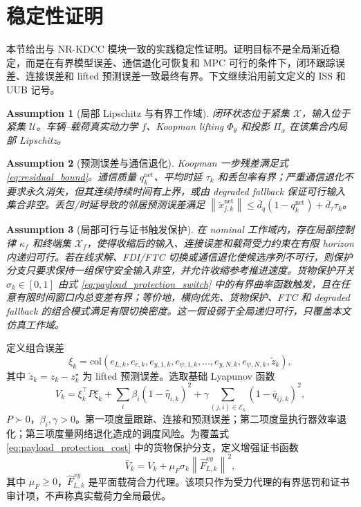 \documentclass[twocolumn,3p,times,procedia]{elsarticle}
\newcommand{\Method}{NR-KDCC}
\newcommand{\norm}[1]{\left\lVert #1 \right\rVert}
\newtheorem{assumption}{Assumption}
\begin{document}
\section{稳定性证明}

本节给出与 \Method{} 模块一致的实践稳定性证明。证明目标不是全局渐近稳定，而是在有界模型误差、通信退化可恢复和 MPC 可行的条件下，闭环跟踪误差、连接误差和 lifted 预测误差一致最终有界。下文继续沿用前文定义的 ISS 和 UUB 记号。

\begin{assumption}[局部 Lipschitz 与有界工作域]
闭环状态位于紧集 $\mathcal X$，输入位于紧集 $\mathcal U$。车辆--载荷真实动力学 $f$、Koopman lifting $\Phi_\theta$ 和投影 $\Pi_x$ 在该集合内局部 Lipschitz。
\end{assumption}

\begin{assumption}[预测误差与通信退化]
Koopman 一步残差满足式 \eqref{eq:residual_bound}。通信质量 $q_k^{\mathrm{net}}$、平均时延 $\tau_k$ 和丢包率有界；严重通信退化不要求永久消失，但其连续持续时间有上界，或由 degraded fallback 保证可行输入集合非空。丢包/时延导致的邻居预测误差满足 $\norm{\tilde x_{j,k}^{\mathrm{net}}}\le \bar d_q(1-q_k^{\mathrm{net}})+\bar d_\tau \tau_k$。
\end{assumption}

\begin{assumption}[局部可行与证书触发保护]
在 nominal 工作域内，存在局部控制律 $\kappa_f$ 和终端集 $\mathcal X_f$，使得收缩后的输入、连接误差和载荷受力约束在有限 horizon 内递归可行。若在线求解、FDI/FTC 切换或通信退化使候选序列不可行，则保护分支只要求保持一组保守安全输入非空，并允许收缩参考推进速度。货物保护开关 $\sigma_k\in[0,1]$ 由式 \eqref{eq:payload_protection_switch} 中的有界曲率函数触发，且在任意有限时间窗口内总变差有界；等价地，横向优先、货物保护、FTC 和 degraded fallback 的组合模式满足有限切换密度。这一假设弱于全局递归可行，只覆盖本文仿真工作域。
\end{assumption}

定义组合误差
\begin{equation}
\xi_k=\mathrm{col}\left(e_{L,k},e_{c,k},e_{y,1,k},e_{\psi,1,k},\ldots,e_{y,N,k},e_{\psi,N,k},\tilde z_k\right),
\label{eq:xi_def}
\end{equation}
其中 $\tilde z_k=z_k-z_k^\star$ 为 lifted 预测误差。选取基础 Lyapunov 函数
\begin{equation}
V_k=\xi_k^\top P\xi_k+\sum_i \beta_i(1-\hat\eta_{i,k})^2+\gamma\sum_{(j,i)\in\mathcal E_k}(1-\bar q_{ij,k})^2 ,
\label{eq:lyapunov}
\end{equation}
$P\succ0$，$\beta_i,\gamma>0$。第一项度量跟踪、连接和预测误差；第二项度量执行器效率退化；第三项度量网络退化造成的调度风险。为覆盖式 \eqref{eq:payload_protection_cost} 中的货物保护分支，定义增强证书函数
\begin{equation}
\bar V_k=V_k+\mu_F\sigma_k\norm{\hat F_{L,k}^{xy}}^2 ,
\label{eq:augmented_lyapunov}
\end{equation}
其中 $\mu_F\ge0$，$\hat F_{L,k}^{xy}$ 是平面载荷合力代理。该项只作为受力代理的有界惩罚和证书审计项，不声称真实载荷力全局最优。
\end{document}
